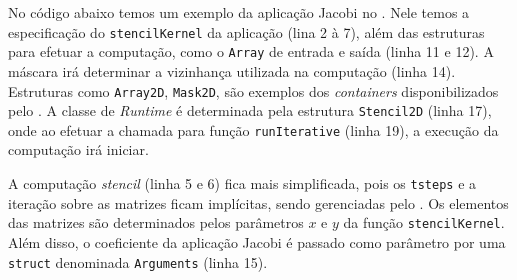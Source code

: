 No código abaixo temos um exemplo da aplicação Jacobi no \fw. Nele temos a
especificação do \texttt{stencilKernel} da aplicação (lina 2 à 7), além das estruturas para
efetuar a computação, como o \texttt{Array} de entrada e saída (linha 11 e 12).
A máscara irá determinar a vizinhança utilizada na computação (linha 14).
Estruturas como \texttt{Array2D}, \texttt{Mask2D}, são exemplos dos
\textit{containers} disponibilizados pelo \fw. A classe de \textit{Runtime} é
determinada pela estrutura \texttt{Stencil2D} (linha 17), onde ao efetuar a chamada para
função \texttt{runIterative} (linha 19), a execução da computação irá iniciar.


A computação \textit{stencil} (linha 5 e 6) fica mais simplificada, pois os
\texttt{tsteps} e a iteração sobre as matrizes ficam implícitas, sendo
gerenciadas pelo \fw. Os elementos das matrizes são determinados pelos
parâmetros $x$ e $y$ da função \texttt{stencilKernel}. Além disso, o coeficiente
da aplicação Jacobi é passado como parâmetro por uma \texttt{struct} denominada
\texttt{Arguments} (linha 15).

\renewcommand{\lstlistingname}{Código}


